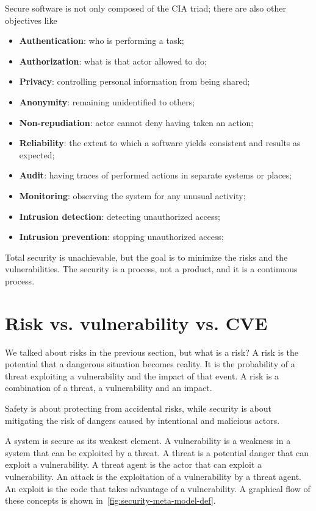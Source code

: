 Secure software is not only composed of the CIA triad; there are also other objectives like~\cite{st-slides}
\begin{itemize}
  \item \textbf{Authentication}: who is performing a task;
  \item \textbf{Authorization}: what is that actor allowed to do;
  \item \textbf{Privacy}: controlling personal information from being shared;
  \item \textbf{Anonymity}: remaining unidentified to others;
  \item \textbf{Non-repudiation}: actor cannot deny having taken an action;
  \item \textbf{Reliability}: the extent to which a software yields consistent and results as expected;
  \item \textbf{Audit}: having traces of performed actions in separate systems or places;
  \item \textbf{Monitoring}: observing the system for any unusual activity;
  \item \textbf{Intrusion detection}: detecting unauthorized access;
  \item \textbf{Intrusion prevention}: stopping unauthorized access;
\end{itemize}

Total security is unachievable, but the goal is to minimize the risks and the vulnerabilities. The security is a process, not a product, and it is a continuous process.~\cite{st-slides}

\section{Risk vs. vulnerability vs. CVE}

We talked about risks in the previous section, but what is a risk? A risk is the potential that a dangerous situation becomes reality. It is the probability of a threat exploiting a vulnerability and the impact of that event. A risk is a combination of a threat, a vulnerability and an impact.

Safety is about protecting from accidental risks, while security is about mitigating the risk of dangers caused by intentional and malicious actors.

A system is secure as its weakest element. A vulnerability is a weakness in a system that can be exploited by a threat. A threat is a potential danger that can exploit a vulnerability. A threat agent is the actor that can exploit a vulnerability. An attack is the exploitation of a vulnerability by a threat agent. An exploit is the code that takes advantage of a vulnerability. A graphical flow of these concepts is shown in~\cref{fig:security-meta-model-def}.

